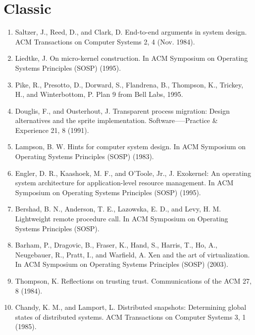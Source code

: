 \section{Classic}

\begin{enumerate}
\item  Saltzer, J., Reed, D., and Clark, D. End-to-end arguments in system design. ACM Transactions on Computer Systems 2, 4 (Nov. 1984).
\item Liedtke, J. On micro-kernel construction. In ACM Symposium on Operating Systems Principles (SOSP) (1995).
\item  Pike, R., Presotto, D., Dorward, S., Flandrena, B., Thompson, K., Trickey, H., and Winterbottom, P. Plan 9 from Bell Labs, 1995.
\item Douglis, F., and Ousterhout, J. Transparent process migration: Design alternatives and the sprite implementation. Software—--Practice \& Experience 21, 8 (1991).
\item  Lampson, B. W. Hints for computer system design. In ACM Symposium on Operating Systems Principles (SOSP) (1983).
\item Engler, D. R., Kaashoek, M. F., and O’Toole, Jr., J. Exokernel: An operating system architecture for application-level resource management. In ACM Symposium on Operating Systems Principles (SOSP) (1995).
\item  Bershad, B. N., Anderson, T. E., Lazowska, E. D., and Levy, H. M. Lightweight remote procedure call. In ACM Symposium on Operating Systems Principles (SOSP).
\item  Barham, P., Dragovic, B., Fraser, K., Hand, S., Harris, T., Ho, A., Neugebauer, R., Pratt, I., and Warfield, A. Xen and the art of virtualization. In ACM Symposium on Operating Systems Principles (SOSP) (2003).
\item Thompson, K. Reflections on trusting trust. Communications of the ACM 27, 8 (1984).
\item Chandy, K. M., and Lamport, L. Distributed snapshots: Determining global states of distributed systems. ACM Transactions on Computer Systems 3, 1 (1985).
\end{enumerate}


